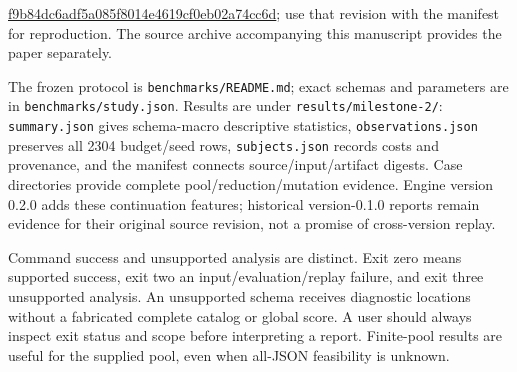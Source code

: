 \documentclass[sigconf,nonacm]{acmart}
\begin{document}
\href{https://github.com/channi23/schema-coverage-lab/commit/f9b84dc6adf5a085f8014e4619cf0eb02a74cc6d}{f9b84dc6adf5a085f8014e4619cf0eb02a74cc6d}; use that revision with the manifest for reproduction. The source archive accompanying this manuscript provides the paper separately.

The frozen protocol is \texttt{b\allowbreak{}e\allowbreak{}n\allowbreak{}c\allowbreak{}h\allowbreak{}m\allowbreak{}a\allowbreak{}r\allowbreak{}k\allowbreak{}s\allowbreak{}/\allowbreak{}R\allowbreak{}E\allowbreak{}A\allowbreak{}D\allowbreak{}M\allowbreak{}E\allowbreak{}.\allowbreak{}m\allowbreak{}d}; exact schemas and parameters are in \texttt{b\allowbreak{}e\allowbreak{}n\allowbreak{}c\allowbreak{}h\allowbreak{}m\allowbreak{}a\allowbreak{}r\allowbreak{}k\allowbreak{}s\allowbreak{}/\allowbreak{}s\allowbreak{}t\allowbreak{}u\allowbreak{}d\allowbreak{}y\allowbreak{}.\allowbreak{}j\allowbreak{}s\allowbreak{}o\allowbreak{}n}. Results are under \texttt{r\allowbreak{}e\allowbreak{}s\allowbreak{}u\allowbreak{}l\allowbreak{}t\allowbreak{}s\allowbreak{}/\allowbreak{}m\allowbreak{}i\allowbreak{}l\allowbreak{}e\allowbreak{}s\allowbreak{}t\allowbreak{}o\allowbreak{}n\allowbreak{}e\allowbreak{}-\allowbreak{}2\allowbreak{}/}: \texttt{s\allowbreak{}u\allowbreak{}m\allowbreak{}m\allowbreak{}a\allowbreak{}r\allowbreak{}y\allowbreak{}.\allowbreak{}j\allowbreak{}s\allowbreak{}o\allowbreak{}n} gives schema-macro descriptive statistics, \texttt{o\allowbreak{}b\allowbreak{}s\allowbreak{}e\allowbreak{}r\allowbreak{}v\allowbreak{}a\allowbreak{}t\allowbreak{}i\allowbreak{}o\allowbreak{}n\allowbreak{}s\allowbreak{}.\allowbreak{}j\allowbreak{}s\allowbreak{}o\allowbreak{}n} preserves all 2304 budget/seed rows, \texttt{s\allowbreak{}u\allowbreak{}b\allowbreak{}j\allowbreak{}e\allowbreak{}c\allowbreak{}t\allowbreak{}s\allowbreak{}.\allowbreak{}j\allowbreak{}s\allowbreak{}o\allowbreak{}n} records costs and provenance, and the manifest connects source/input/artifact digests. Case directories provide complete pool/reduction/mutation evidence. Engine version 0.2.0 adds these continuation features; historical version-0.1.0 reports remain evidence for their original source revision, not a promise of cross-version replay.

Command success and unsupported analysis are distinct. Exit zero means supported success, exit two an input/evaluation/replay failure, and exit three unsupported analysis. An unsupported schema receives diagnostic locations without a fabricated complete catalog or global score. A user should always inspect exit status and scope before interpreting a report. Finite-pool results are useful for the supplied pool, even when all-JSON feasibility is unknown.
\end{document}
